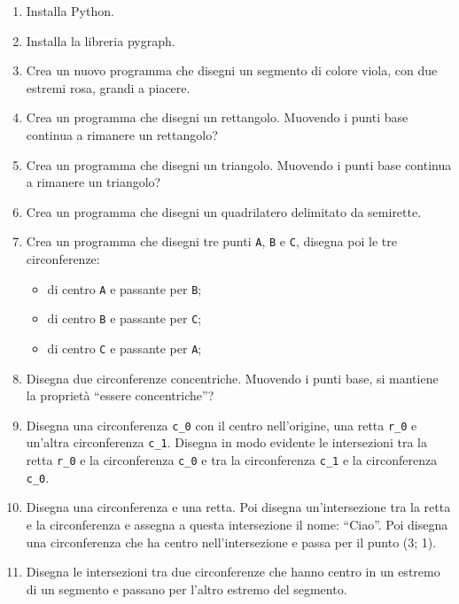 \begin{enumerate} [noitemsep]
\item Installa Python.

\item Installa la libreria pygraph.

\item Crea un nuovo programma che disegni un segmento di colore viola,
con due estremi rosa, grandi a piacere.

\item Crea un programma che disegni un rettangolo. Muovendo i punti base
continua a rimanere un rettangolo?

\item Crea un programma che disegni un triangolo. Muovendo i punti base
continua a rimanere un triangolo?

\item Crea un programma che disegni un quadrilatero delimitato da semirette.

\item Crea un programma che disegni tre punti \texttt{A}, \texttt{B} e 
\texttt{C}, disegna poi le tre circonferenze:
\begin{itemize} [nosep]
\item di centro \texttt{A} e passante per \texttt{B};
\item di centro \texttt{B} e passante per \texttt{C};
\item di centro \texttt{C} e passante per \texttt{A};
\end{itemize}

\item Disegna due circonferenze concentriche. Muovendo i punti base, si 
mantiene la proprietà ``essere concentriche''?

\item Disegna una circonferenza \texttt{c\_0} con il centro nell'origine,
una retta \texttt{r\_0} e un'altra circonferenza \texttt{c\_1}.
Disegna in modo evidente le intersezioni tra la retta \texttt{r\_0} e la
circonferenza \texttt{c\_0} e tra la circonferenza \texttt{c\_1} e la
circonferenza \texttt{c\_0}.

\item Disegna una circonferenza e una retta. Poi disegna un'intersezione tra
la retta e la circonferenza e assegna a questa intersezione il nome:
``Ciao''. Poi disegna una circonferenza che ha centro nell'intersezione
e passa per il punto (3; 1).

\item Disegna le intersezioni tra due circonferenze che hanno centro in un 
estremo di un segmento e passano per l'altro estremo del segmento.


\end{enumerate}
